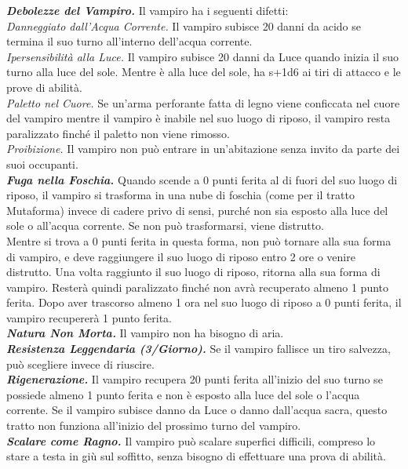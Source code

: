 \begin{multicols}{2}
\emph{\textbf{Debolezze del Vampiro.}} Il vampiro ha i seguenti difetti:\\
\emph{Danneggiato dall'Acqua Corrente.} Il vampiro subisce 20 danni da acido se termina il suo turno all'interno dell'acqua corrente.\\
\emph{Ipersensibilità alla Luce.} Il vampiro subisce 20 danni da Luce quando inizia il suo turno alla luce del sole. Mentre è alla luce del sole, ha s+1d6 ai tiri di attacco e le prove di abilità. \\
\emph{Paletto nel Cuore.} Se un'arma perforante fatta di legno viene conficcata nel cuore del vampiro mentre il vampiro è inabile nel suo luogo di riposo, il vampiro resta paralizzato finché il paletto non viene rimosso.\\
\emph{Proibizione.} Il vampiro non può entrare in un'abitazione senza invito da parte dei suoi occupanti.\\
\emph{\textbf{Fuga nella Foschia.}} Quando scende a 0 punti ferita al di fuori del suo luogo di riposo, il vampiro si trasforma in una nube di foschia (come per il tratto Mutaforma) invece di cadere privo di sensi, purché non sia esposto alla luce del sole o all'acqua corrente. Se non può trasformarsi, viene distrutto.\\
Mentre si trova a 0 punti ferita in questa forma, non può tornare alla sua forma di vampiro, e deve raggiungere il suo luogo di riposo entro 2 ore o venire distrutto. Una volta raggiunto il suo luogo di riposo, ritorna alla sua forma di vampiro. Resterà quindi paralizzato finché non avrà recuperato almeno 1 punto ferita. Dopo aver trascorso almeno 1 ora nel suo luogo di riposo a 0 punti ferita, il vampiro recupererà 1 punto ferita.\\
\emph{\textbf{Natura Non Morta.}} Il vampiro non ha bisogno di aria. \\
\emph{\textbf{Resistenza Leggendaria (3/Giorno).}} Se il vampiro fallisce un tiro salvezza, può scegliere invece di riuscire.\\
\emph{\textbf{Rigenerazione.}} Il vampiro recupera 20 punti ferita all'inizio del suo turno se possiede almeno 1 punto ferita e non è esposto alla luce del sole o l'acqua corrente. Se il vampiro subisce danno da Luce o danno dall'acqua sacra, questo tratto non funziona all'inizio del prossimo turno del vampiro.\\
\emph{\textbf{Scalare come Ragno.}} Il vampiro può scalare superfici difficili, compreso lo stare a testa in giù sul soffitto, senza bisogno di effettuare una prova di abilità.\\

\end{multicols}
